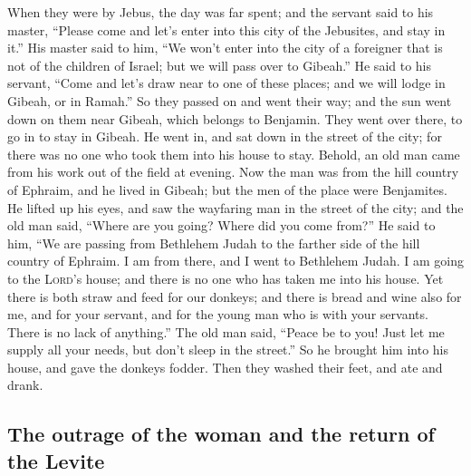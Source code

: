  When they were by Jebus, the day was far spent; and the
servant said to his master, ``Please come and let's enter into this city
of the Jebusites, and stay in it.''  His master said to
him, ``We won't enter into the city of a foreigner that is not of the
children of Israel; but we will pass over to Gibeah.'' 
He said to his servant, ``Come and let's draw near to one of these
places; and we will lodge in Gibeah, or in Ramah.''  So
they passed on and went their way; and the sun went down on them near
Gibeah, which belongs to Benjamin.  They went over there,
to go in to stay in Gibeah. He went in, and sat down in the street of
the city; for there was no one who took them into his house to stay.
 Behold, an old man came from his work out of the field
at evening. Now the man was from the hill country of Ephraim, and he
lived in Gibeah; but the men of the place were Benjamites.
 He lifted up his eyes, and saw the wayfaring man in the
street of the city; and the old man said, ``Where are you going? Where
did you come from?''  He said to him, ``We are passing
from Bethlehem Judah to the farther side of the hill country of Ephraim.
I am from there, and I went to Bethlehem Judah. I am going to the
\textsc{Lord}'s house; and there is no one who has taken me into his
house.  Yet there is both straw and feed for our donkeys;
and there is bread and wine also for me, and for your servant, and for
the young man who is with your servants. There is no lack of anything.''
 The old man said, ``Peace be to you! Just let me supply
all your needs, but don't sleep in the street.''  So he
brought him into his house, and gave the donkeys fodder. Then they
washed their feet, and ate and drank.

\hypertarget{the-outrage-of-the-woman-and-the-return-of-the-levite}{%
\subsection{The outrage of the woman and the return of the
Levite}\label{the-outrage-of-the-woman-and-the-return-of-the-levite}}

